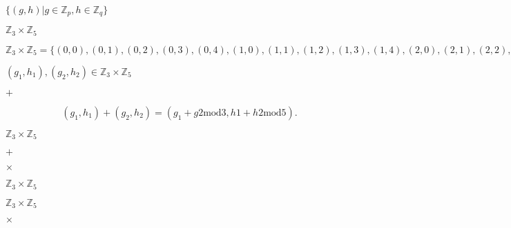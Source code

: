\documentclass[10pt]{book}
\begin{document}
\begin{mdSnippets}
\begin{mdInlineSnippet}[fb71a560923926b09ceeb9594fe441ed]
$\{(g,h) | g\in\mathbb{Z}_p, h\in\mathbb{Z}_q\}$\end{mdInlineSnippet}%
\begin{mdInlineSnippet}[ae3279d076eb27b24ba0cb905ee71da3]%
$\mathbb{Z}_3\times\mathbb{Z}_5$\end{mdInlineSnippet}%
\begin{mdInlineSnippet}[bc31933d713ee2e9d9a69f0b4e8b8c66]%
$\mathbb{Z}_3\times\mathbb{Z}_5 = \{(0,0), (0,1), (0,2), (0,3), (0,4), (1,0), (1,1), (1,2), (1,3), (1,4), (2,0), (2,1), (2,2), (2,3), (2,4)\}$\end{mdInlineSnippet}%
\begin{mdInlineSnippet}[dc369b235d24370a49e8748fae00300a]%
$(g_1, h_1), (g_2, h_2)\in\mathbb{Z}_3\times\mathbb{Z}_5$\end{mdInlineSnippet}%
\begin{mdInlineSnippet}[26b17225b626fb9238849fd60eabdf60]%
$+$\end{mdInlineSnippet}%
\begin{mdDisplaySnippet}[96dd964424c9aaa3f1329a5b8c05fa0a]%
\[%
(g_1,h_1)+(g_2,h_2) = (g_1+g2 \mathrm{mod} 3, h1+h2 \mathrm{mod} 5).
\]%
\end{mdDisplaySnippet}%
\begin{mdInlineSnippet}[ae3279d076eb27b24ba0cb905ee71da3]%
$\mathbb{Z}_3\times\mathbb{Z}_5$\end{mdInlineSnippet}%
\begin{mdInlineSnippet}[26b17225b626fb9238849fd60eabdf60]%
$+$\end{mdInlineSnippet}%
\begin{mdInlineSnippet}[60c13e05d3ec8c10b8564eae7023d9db]%
$\times$\end{mdInlineSnippet}%
\begin{mdInlineSnippet}[ae3279d076eb27b24ba0cb905ee71da3]%
$\mathbb{Z}_3\times\mathbb{Z}_5$\end{mdInlineSnippet}%
\begin{mdInlineSnippet}[ae3279d076eb27b24ba0cb905ee71da3]%
$\mathbb{Z}_3\times\mathbb{Z}_5$\end{mdInlineSnippet}%
\begin{mdInlineSnippet}[60c13e05d3ec8c10b8564eae7023d9db]%
$\times$\end{mdInlineSnippet}%

\end{mdSnippets}
\end{document}
